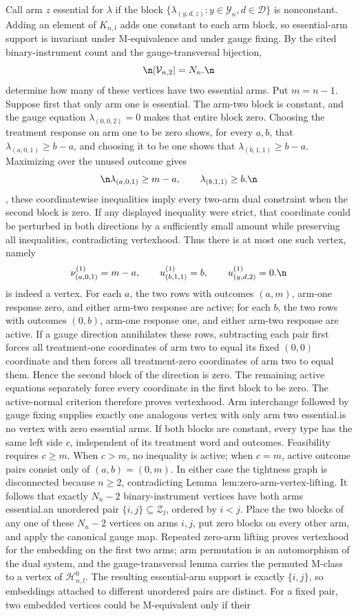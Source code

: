 Call arm \(z\) essential for \(\lambda\) if the block \(\{\lambda_{(y,d,z)}:y\in\mathcal Y_n,d\in\mathcal D\}\) is nonconstant. Adding an element of \(K_{n,l}\) adds one constant to each arm block, so essential-arm support is invariant under M-equivalence and under gauge fixing. By the cited binary-instrument count and the gauge-transversal bijection,\n\[\n|\mathcal V_{n,2}|=N_n.\n\]\nWe determine how many of these vertices have two essential arms. Put \(m=n-1\). Suppose first that only arm one is essential. The arm-two block is constant, and the gauge equation \(\lambda_{(0,0,2)}=0\) makes that entire block zero. Choosing the treatment response on arm one to be zero shows, for every \(a,b\), that \(\lambda_{(a,0,1)}\ge b-a\), and choosing it to be one shows that \(\lambda_{(b,1,1)}\ge b-a\). Maximizing over the unused outcome gives\n\[\n\lambda_{(a,0,1)}\ge m-a,\qquad \lambda_{(b,1,1)}\ge b.\n\]\nConversely, these coordinatewise inequalities imply every two-arm dual constraint when the second block is zero. If any displayed inequality were strict, that coordinate could be perturbed in both directions by a sufficiently small amount while preserving all inequalities, contradicting vertexhood. Thus there is at most one such vertex, namely\n\[\nu^{(1)}_{(a,0,1)}=m-a,\qquad u^{(1)}_{(b,1,1)}=b,\qquad u^{(1)}_{(y,d,2)}=0.\n\]\nIt is indeed a vertex. For each \(a\), the two rows with outcomes \((a,m)\), arm-one response zero, and either arm-two response are active; for each \(b\), the two rows with outcomes \((0,b)\), arm-one response one, and either arm-two response are active. If a gauge direction annihilates these rows, subtracting each pair first forces all treatment-one coordinates of arm two to equal its fixed \((0,0)\) coordinate and then forces all treatment-zero coordinates of arm two to equal them. Hence the second block of the direction is zero. The remaining active equations separately force every coordinate in the first block to be zero. The active-normal criterion therefore proves vertexhood. Arm interchange followed by gauge fixing supplies exactly one analogous vertex with only arm two essential.\n\nThere is no vertex with zero essential arms. If both blocks are constant, every type has the same left side \(c\), independent of its treatment word and outcomes. Feasibility requires \(c\ge m\). When \(c>m\), no inequality is active; when \(c=m\), active outcome pairs consist only of \((a,b)=(0,m)\). In either case the tightness graph is disconnected because \(n\ge2\), contradicting Lemma~\(\text{lem:zero-arm-vertex-lifting}\). It follows that exactly \(N_n-2\) binary-instrument vertices have both arms essential.\n\nFix an unordered pair \(\{i,j\}\subseteq\mathcal Z_l\), ordered by \(i<j\). Place the two blocks of any one of these \(N_n-2\) vertices on arms \(i,j\), put zero blocks on every other arm, and apply the canonical gauge map. Repeated zero-arm lifting proves vertexhood for the embedding on the first two arms; arm permutation is an automorphism of the dual system, and the gauge-transversal lemma carries the permuted M-class to a vertex of \(\mathcal H^0_{n,l}\). The resulting essential-arm support is exactly \(\{i,j\}\), so embeddings attached to different unordered pairs are distinct. For a fixed pair, two embedded vertices could be M-equivalent only if their 